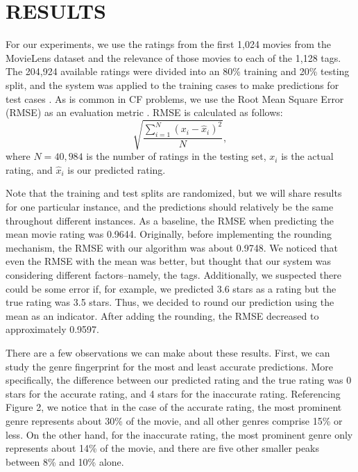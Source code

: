 \documentclass[letterpaper, 10 pt, conference]{ieeeconf}  %
\begin{document}
\section{RESULTS}

For our experiments, we use the ratings from the first 1,024 movies from the MovieLens dataset and the relevance of those movies to each of the 1,128 tags. The 204,924 available ratings were divided into an 80\% training and 20\% testing split, and the system was applied to the training cases to make predictions for test cases \cite{lenskitmodule}. As is common in CF problems, we use the Root Mean Square Error (RMSE) as an evaluation metric \cite{lenskitmodule}. RMSE is calculated as follows: 
$$\sqrt{\frac{\sum_{i=1}^N (x_i - \hat{x}_i)^2}{N}},$$
where $N=40,984$ is the number of ratings in the testing set, $x_i$ is the actual rating, and $\hat{x}_i$ is our predicted rating.

Note that the training and test splits are randomized, but we will share results for one particular instance, and the predictions should relatively be the same throughout different instances. As a baseline, the RMSE when predicting the mean movie rating was 0.9644. Originally, before implementing the rounding mechanism, the RMSE with our algorithm was about 0.9748. We noticed that even the RMSE with the mean was better, but thought that our system was considering different factors--namely, the tags. Additionally, we suspected there could be some error if, for example, we predicted 3.6 stars as a rating but the true rating was 3.5 stars. Thus, we decided to round our prediction using the mean as an indicator. After adding the rounding, the RMSE decreased to approximately 0.9597. 

There are a few observations we can make about these results. First, we can study the genre fingerprint for the most and least accurate predictions. More specifically, the difference between our predicted rating and the true rating was 0 stars for the accurate rating, and 4 stars for the inaccurate rating. Referencing Figure 2, we notice that in the case of the accurate rating, the most prominent genre represents about 30\% of the movie, and all other genres comprise 15\% or less. On the other hand, for the inaccurate rating, the most prominent genre only represents about 14\% of the movie, and there are five other smaller peaks between 8\% and 10\% alone.
\end{document}
